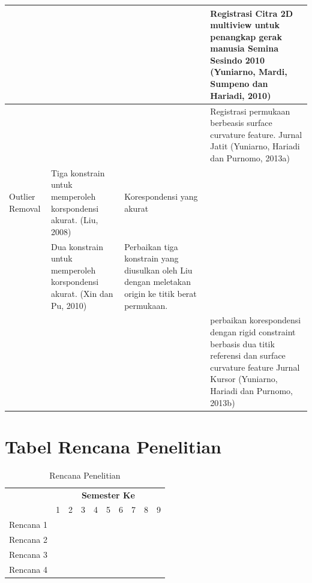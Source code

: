 \begin{landscape}
\begin{spacing}{1}
\begin{longtable}{|p{3cm}| p{7cm} | p{7cm} | p{7cm}|}
	& 	& 	& 	Registrasi Citra  2D multiview untuk penangkap gerak manusia
	Semina Sesindo 2010 (Yuniarno, Mardi, Sumpeno dan Hariadi, 2010)\\ \hline 
	& 	& 	& 	Registrasi permukaan berbeasis surface curvature feature.
	Jurnal Jatit  (Yuniarno, Hariadi dan Purnomo, 2013a) \\ \hline 
	Outlier Removal& 	Tiga konstrain untuk memperoleh korspondensi akurat. 
	(Liu, 2008)& 	Korespondensi yang akurat& 	\\ \hline 
	& 	Dua  konstrain untuk memperoleh korspondensi akurat. 
	(Xin dan Pu, 2010)& 	Perbaikan tiga konstrain yang diusulkan oleh Liu dengan meletakan origin ke titik berat permukaan.& 	\\ \hline 
	& 	& 	& 	perbaikan korespondensi 
	dengan rigid constraint berbasis dua titik referensi dan surface curvature feature Jurnal Kursor (Yuniarno, Hariadi dan Purnomo, 2013b)\cite{Brathwaite2009} \\ \hline 
\end{longtable}

\end{spacing}

\end{landscape}
\section{Tabel Rencana Penelitian }


\begin{table}[h!]
	\caption{Rencana Penelitian}
	\begin{tabular}{|l|l|l|l|l|l|l|l|l|l|}
		\hline
		& \multicolumn{9}{c|}{\textbf{Semester Ke}} \\ \cline{2-10} 
		\multirow{-2}{*}{} & 1 & 2 & 3 & 4 & 5 & 6 & 7 & 8 & 9 \\ \hline
		Rencana 1 & \cellcolor[HTML]{000000} & \cellcolor[HTML]{000000} & \cellcolor[HTML]{000000} & \cellcolor[HTML]{000000} & \cellcolor[HTML]{000000} &  &  &  &  \\ \hline
		Rencana 2 &  &  & \cellcolor[HTML]{000000} & \cellcolor[HTML]{000000} & \cellcolor[HTML]{000000} & \cellcolor[HTML]{000000} & \cellcolor[HTML]{000000} &  &  \\ \hline
		Rencana 3 &  &  &  &  &  & \cellcolor[HTML]{000000} & \cellcolor[HTML]{000000} & \cellcolor[HTML]{000000} & \cellcolor[HTML]{000000} \\ \hline
		Rencana 4 &  & \cellcolor[HTML]{000000} & \cellcolor[HTML]{000000}{\color[HTML]{000000} } & \cellcolor[HTML]{000000}{\color[HTML]{000000} } & \cellcolor[HTML]{000000}{\color[HTML]{000000} } & \cellcolor[HTML]{000000}{\color[HTML]{000000} } & \cellcolor[HTML]{000000}{\color[HTML]{000000} } & \cellcolor[HTML]{000000}{\color[HTML]{000000} } & \cellcolor[HTML]{000000}{\color[HTML]{000000} } \\ \hline
	\end{tabular}
\end{table}



